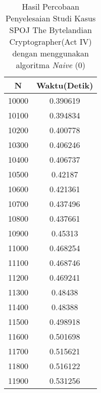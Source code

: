 \begin{table}[H]
\centering
\caption {Hasil Percobaan Penyelesaian Studi Kasus SPOJ The Bytelandian Cryptographer(Act IV) dengan menggunakan algoritma \textit{Naive} (0)}
\begin{tabular}{|c|c|}\hline
N&Waktu(Detik)\\ \hline
10000&0.390619\\ \hline
10100&0.394834\\ \hline
10200&0.400778\\ \hline
10300&0.406246\\ \hline
10400&0.406737\\ \hline
10500&0.42187\\ \hline
10600&0.421361\\ \hline
10700&0.437496\\ \hline
10800&0.437661\\ \hline
10900&0.45313\\ \hline
11000&0.468254\\ \hline
11100&0.468746\\ \hline
11200&0.469241\\ \hline
11300&0.48438\\ \hline
11400&0.48388\\ \hline
11500&0.498918\\ \hline
11600&0.501698\\ \hline
11700&0.515621\\ \hline
11800&0.516122\\ \hline
11900&0.531256\\ \hline
\end{tabular}
\label{tab:res2}
\end{table}
